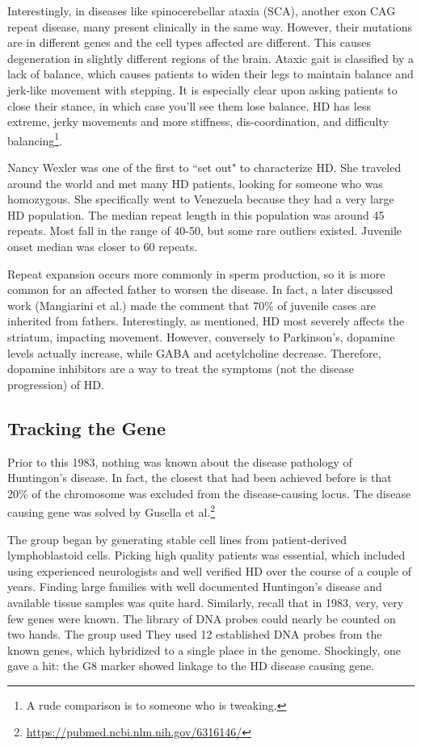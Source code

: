 Interestingly, in diseases like spinocerebellar ataxia (SCA), another exon CAG repeat disease, many present clinically in the same way. However, their mutations are in different genes and the cell types affected are different. This causes degeneration in slightly different regions of the brain. Ataxic gait is classified by a lack of balance, which causes patients to widen their legs to maintain balance and jerk-like movement with stepping. It is especially clear upon asking patients to close their stance, in which case you'll see them lose balance. HD has less extreme, jerky movements and more stiffness, dis-coordination, and difficulty balancing\footnote{A rude comparison is to someone who is tweaking.}. \newline

Nancy Wexler was one of the first to ``set out" to characterize HD. She traveled around the world and met many HD patients, looking for someone who was homozygous. She specifically went to Venezuela because they had a very large HD population. The median repeat length in this population was around 45 repeats. Most fall in the range of 40-50, but some rare outliers existed. Juvenile onset median was closer to 60 repeats.\newline

Repeat expansion occurs more commonly in sperm production, so it is more common for an affected father to worsen the disease. In fact, a later discussed work (Mangiarini et al.) made the comment that 70\% of juvenile cases are inherited from fathers. Interestingly, as mentioned, HD most severely affects the striatum, impacting movement. However, conversely to Parkinson's, dopamine levels actually increase, while GABA and acetylcholine decrease. Therefore, dopamine inhibitors are a way to treat the symptoms (not the disease progression) of HD. 


\subsection*{Tracking the Gene}

Prior to this 1983, nothing was known about the disease pathology of Huntingon's disease. In fact, the closest that had been achieved before is that 20\% of the chromosome was excluded from the disease-causing locus. The disease causing gene was solved by Gusella et al.\footnote{\url{https://pubmed.ncbi.nlm.nih.gov/6316146/}}\newline

The group began by generating stable cell lines from patient-derived lymphoblastoid cells. Picking high quality patients was essential, which included using experienced neurologists and well verified HD over the course of a couple of years. Finding large families with well documented Huntingon's disease and available tissue samples was quite hard. Similarly, recall that in 1983, very, very few genes were known. The library of DNA probes could nearly be counted on two hands. The group used They used 12 established DNA probes from the known genes, which hybridized to a single place in the genome. Shockingly, one gave a hit: the G8 marker showed linkage to the HD disease causing gene.\newline

